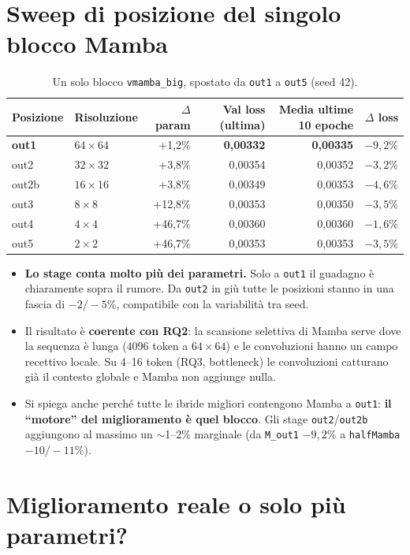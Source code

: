 \documentclass[11pt,a4paper]{article}
\newcommand{\cfg}[1]{\texttt{#1}}
\newcommand{\best}[1]{\textbf{#1}}
\begin{document}
\section{Sweep di posizione del singolo blocco Mamba}

\begin{table}[h]
\centering
\caption{Un solo blocco \cfg{vmamba\_big}, spostato da \cfg{out1} a \cfg{out5} (seed 42).}
\label{tab:sweep}
\begin{tabular}{@{}llrrrr@{}}
\toprule
Posizione & Risoluzione & $\Delta$ param & Val loss (ultima) & Media ultime 10 epoche & $\Delta$ loss \\
\midrule
\best{out1} & $64\times64$ & +1,2\% & \best{0,00332} & \best{0,00335} & \best{$-9{,}2\%$} \\
out2 & $32\times32$ & +3,8\% & 0,00354 & 0,00352 & $-3{,}2\%$ \\
out2b & $16\times16$ & +3,8\% & 0,00349 & 0,00353 & $-4{,}6\%$ \\
out3 & $8\times8$ & +12,8\% & 0,00353 & 0,00350 & $-3{,}5\%$ \\
out4 & $4\times4$ & +46,7\% & 0,00360 & 0,00360 & $-1{,}6\%$ \\
out5 & $2\times2$ & +46,7\% & 0,00353 & 0,00353 & $-3{,}5\%$ \\
\bottomrule
\end{tabular}
\end{table}

\begin{itemize}
  \item \textbf{Lo stage conta molto più dei parametri.} Solo a \cfg{out1} il guadagno è chiaramente sopra il rumore. Da \cfg{out2} in giù tutte le posizioni stanno in una fascia di $-2/-5\%$, compatibile con la variabilità tra seed.
  \item Il risultato è \textbf{coerente con RQ2}: la scansione selettiva di Mamba serve dove la sequenza è lunga (4096 token a $64\times64$) e le convoluzioni hanno un campo recettivo locale. Su 4--16 token (RQ3, bottleneck) le convoluzioni catturano già il contesto globale e Mamba non aggiunge nulla.
  \item Si spiega anche perché tutte le ibride migliori contengono Mamba a \cfg{out1}: \textbf{il ``motore'' del miglioramento è quel blocco}. Gli stage \cfg{out2}/\cfg{out2b} aggiungono al massimo un $\sim$1--2\% marginale (da \cfg{M\_out1} $-9{,}2\%$ a \cfg{halfMamba} $-10/-11\%$).
\end{itemize}

\section{Miglioramento reale o solo più parametri?}
\end{document}
